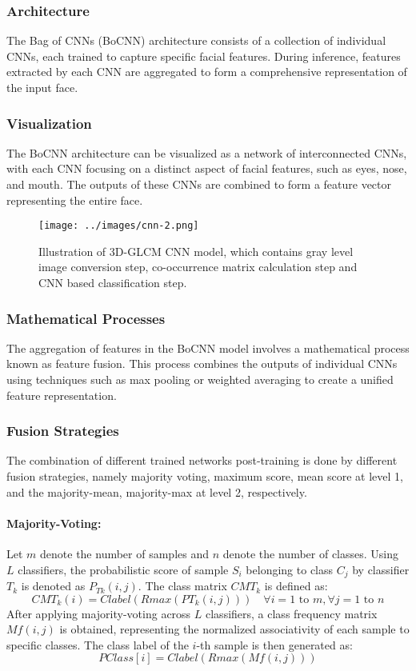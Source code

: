 \documentclass[journal, biblatex]{IEEEtran}
\begin{document}
\subsubsection{Architecture}
The Bag of CNNs (BoCNN) architecture consists of a collection of individual CNNs, each trained to capture specific facial features. During inference, features extracted by each CNN are aggregated to form a comprehensive representation of the input face.

\subsubsection{Visualization}
The BoCNN architecture can be visualized as a network of interconnected CNNs, with each CNN focusing on a distinct aspect of facial features, such as eyes, nose, and mouth. The outputs of these CNNs are combined to form a feature vector representing the entire face.

\begin{figure*}[htbp]
    \centering
    \texttt{[image: ../images/cnn-2.png]}
    \caption{Illustration of 3D-GLCM CNN model, which contains gray level image conversion step, co-occurrence matrix calculation step and CNN
    based classification step.}
    \label{fig:fusion_architecture}
\end{figure*}

\subsubsection{Mathematical Processes}
The aggregation of features in the BoCNN model involves a mathematical process known as feature fusion. This process combines the outputs of individual CNNs using techniques such as max pooling or weighted averaging to create a unified feature representation.

\subsubsection{Fusion Strategies}
The combination of different trained networks post-training is done by different fusion strategies, namely majority voting, maximum score, mean score at level 1, and the majority-mean, majority-max at level 2, respectively.

\paragraph{Majority-Voting:} Let $m$ denote the number of samples and $n$ denote the number of classes. Using $L$ classifiers, the probabilistic score of sample $S_i$ belonging to class $C_j$ by classifier $T_k$ is denoted as $P_{Tk}(i,j)$. The class matrix $CMT_k$ is defined as:
\[ 
    CMT_k(i) = Clabel(Rmax(PT_k(i,j))) \quad \forall i = 1 \text{ to } m, \forall j = 1 \text{ to } n 
\]
After applying majority-voting across $L$ classifiers, a class frequency matrix $Mf(i,j)$ is obtained, representing the normalized associativity of each sample to specific classes. The class label of the $i$-th sample is then generated as:
\[ PClass[i] = Clabel(Rmax(Mf(i,j))) \]
\end{document}

